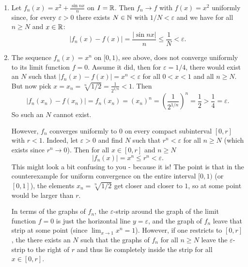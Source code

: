 \documentclass[10pt, a4paper]{article}
\begin{document}
\begin{example}
    \begin{enumerate}[label = (\roman*)]
        \item Let $f_n(x) = x ^ 2 + \frac{\sin{nx}}{n}$ on $I = \mathbb{R}$.
        Then $f_n \rightarrow f$ with $f(x) = x ^ 2$ uniformly since,
        for every $\varepsilon > 0$ there exists $N \in \mathbb{N}$ with $1 / N < \varepsilon$ and we have for all $n \geq N$ and $x \in \mathbb{R}$:
        \[
        |f_n(x) - f(x)| = \frac{|\sin{nx}|}{n} \leq \frac{1}{N} < \varepsilon.
        \]

        \item The sequence $f_n(x) = x ^ n$ on $[0, 1)$,
        see above,
        does not converge uniformly to its limit function $f = 0$.
        Assume it did,
        then for $\varepsilon = 1 / 4$,
        there would exist an $N$ such that $|f_n(x) - f(x)| = x ^ n < \varepsilon$ for all $0 < x < 1$ and all $n \geq N$.
        But now pick $x = x_n = \sqrt[n]{1 / 2} = \frac{1}{2 ^ {1 / n}} < 1$.
        Then
        \[
        |f_n(x_n) - f(x_n)| = f_n(x_n) = (x_n) ^ n = \left(\frac{1}{2 ^ {1 / n}}\right) ^ n = \frac{1}{2} > \frac{1}{4} = \varepsilon.
        \]
        So such an $N$ cannot exist.

        However,
        $f_n$ converges uniformly to $0$ on every compact subinterval $[0, r]$ with $r < 1$.
        Indeed,
        let $\varepsilon > 0$ and find $N$ such that $r ^ n < \varepsilon$ for all $n \geq N$
        (which exists since $r ^ n \rightarrow 0$).
        Then for all $x \in [0, r]$ and $n \geq N$
        \[
        |f_n(x)| = x ^ n \leq r ^ n < \varepsilon.
        \]
        This might look a bit confusing to you - because it is!
        The point is that in the counterexample for uniform convergence on the entire interval $[0, 1)$
        (or $[0, 1]$),
        the elements $x_n = \sqrt[n]{1 / 2}$ get closer and closer to $1$,
        so at some point would be larger than $r$.

        In terms of the graphs of $f_n$,
        the $\varepsilon$-strip around the graph of the limit function $f = 0$ is just the horizontal line $y = \varepsilon$,
        and the graph of $f_n$ leave that strip at some point
        (since $\lim_{x \rightarrow 1}x ^ n = 1$).
        However,
        if one restricts to $[0, r]$,
        the there exists an $N$ such that the graphs of $f_n$ for all $n \geq N$ leave the $\varepsilon$-strip to the right of $r$ and thus lie completely inside the strip for all $x \in [0, r]$.
    \end{enumerate}
\end{example}
\end{document}
